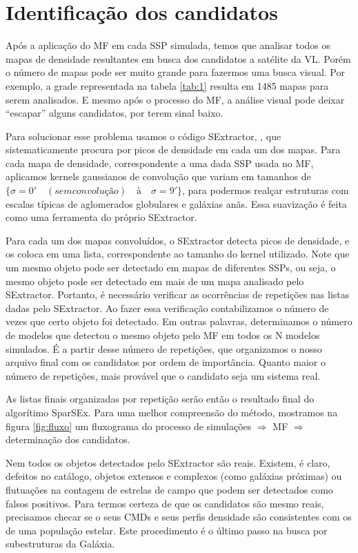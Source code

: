 \documentclass[
	12pt,				%
	openany,			%
	oneside,			%
	a4paper,			%
	english,			%
	brazil				%
	]{abntex2}
\begin{document}
\chapter{Identificação dos candidatos}
Após a aplicação do MF em cada SSP simulada, temos que analisar todos os mapas de densidade resultantes em busca dos candidatos a satélite da VL. Porém o número de mapas pode ser muito grande para fazermos uma busca visual. Por exemplo, a grade representada na tabela \ref{tab:1} resulta em 1485 mapas para serem analisados. E mesmo após o processo do MF, a análise visual pode deixar “escapar” alguns candidatos, por terem sinal baixo.  \par
Para solucionar esse problema usamos o código SExtractor, \cite{1996A&AS..117..393B}, que sistematicamente procura por picos de densidade em cada um dos mapas.
Para cada mapa de densidade, correspondente a uma  dada SSP usada no MF, aplicamos kernels gaussianos de convolução que variam em tamanhos de $ \{ \sigma = 0'\quad (sem convolução)\quad à\quad  \sigma = 9'\}$, para podermos realçar estruturas com escalas típicas de aglomerados globulares e galáxias anãs. Essa suavização é feita como uma ferramenta do próprio SExtractor. \par
Para cada um dos mapas convoluídos, o  SExtractor detecta picos de densidade, e os coloca em uma lista, correspondente ao tamanho do kernel utilizado. Note que um mesmo objeto pode ser detectado  em mapas de diferentes SSPs, ou seja, o mesmo objeto pode ser detectado em mais de um mapa analisado pelo SExtractor. Portanto, é necessário verificar as ocorrências de repetições nas listas dadas pelo SExtractor. Ao fazer essa verificação contabilizamos o número de vezes que certo objeto foi detectado. Em outras palavras, determinamos o número de  modelos que detectou o mesmo objeto pelo MF em todos os N modelos simulados.
É a partir desse número de repetições,  que organizamos o nosso arquivo final com os candidatos por ordem de importância. Quanto maior o número de  repetições, mais provável que o candidato seja um sistema real. \par
As listas finais organizadas por repetição serão então o resultado final do algorítimo SparSEx. Para uma melhor compreensão do método, mostramos na figura \ref{fig:fluxo} um fluxograma do processo de simulações $\Rightarrow$ MF  $\Rightarrow$ determinação dos candidatos. \par

Nem todos os objetos detectados pelo SExtractor são reais. Existem, é claro, defeitos no catálogo, objetos extensos e complexos (como galáxias próximas) ou flutuações na contagem de estrelas de campo que podem ser detectados como falsos positivos. Para termos certeza de que os candidatos são mesmo reais, precisamos checar se o seus CMDs e seus perfis densidade são consistentes com os de uma população estelar. Este procedimento é o  último passo na busca por subestruturas da Galáxia.  
\end{document}
